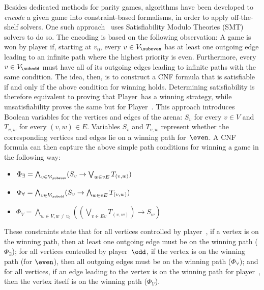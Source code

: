 \documentclass[runningheads]{llncs}
\begin{document}
Besides dedicated methods for parity games, algorithms have been developed to \textit{encode} a given game into constraint-based formalisms, in order to apply off-the-shelf solvers. One such approach~\cite{Heljanko:2012} uses Satisfiability Modulo Theories (SMT) solvers to do so. 
The encoding is based on the following observation:
%
A game is won by player \even if, starting at $v_0$, every $v \in V_{\subeven}$ has at least one outgoing edge leading to an infinite path where the highest priority is even. Furthermore, every $v \in V_{\subodd}$ must have all of its outgoing edges leading to infinite paths with the same condition.
%
The idea, then, is to construct a CNF formula that is satisfiable if and only if the above condition for winning
%
holds. Determining satisfiability is therefore equivalent to proving that Player~\even has a winning strategy, while unsatisfiability proves the same but for Player~\odd.
%
This approach introduces Boolean variables for the vertices and edges of the arena: $S_v$ for every $v \in V$ and $T_{v,w}$ for every $(v, w) \in E$. Variables $S_v$ and $T_{v,w}$ represent whether the corresponding vertices and edges lie on a winning path for~$\even$.
%
A CNF formula can then capture the above simple path conditions for winning a game in the following way:

\begin{itemize}
    \item $\Phi_\exists = \bigwedge_{v \in V_{\subeven}} (S_v \rightarrow \bigvee_{w \in vE} T_{(v,w)})$
    \item $\Phi_\forall = \bigwedge_{v \in V_{\subodd}} (S_v \rightarrow \bigwedge_{w \in vE} T_{(v,w)})$
    \item $\Phi_V = \bigwedge_{w \in V, w \neq v_0} \left( \left(\bigvee_{v \in Ev} T_{(v,w)}\right) \rightarrow S_w \right)$
\end{itemize}

These constraints state that for all vertices controlled by player~\even, if a vertex is on the winning path, then at least one outgoing edge must be on the winning path ($\Phi_\exists$); for all vertices controlled by player~$\odd$, if the vertex is on the winning path (for $\even$), then all outgoing edges must be on the winning path ($\Phi_\forall$); and for all vertices, if an edge leading to the vertex is on the winning path for player~\even, then the vertex itself is on the winning path ($\Phi_V$).
\end{document}

